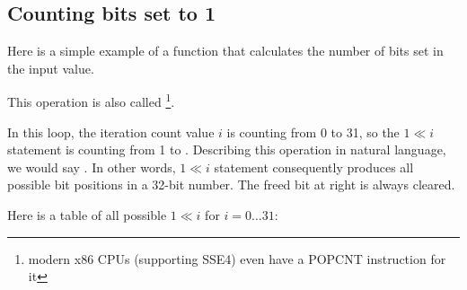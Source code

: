 ﻿\subsection{Counting bits set to 1}

Here is a simple example of a function that calculates the number of bits set in the input value.

This operation is also called \footnote{modern x86 CPUs (supporting SSE4) even have a POPCNT instruction for it}.



In this loop, the iteration count value $i$ is counting from 0 to 31, 
so the $1 \ll i$ statement is counting from 1 to .
Describing this operation in natural language, we would say .
In other words, $1 \ll i$ statement consequently produces all possible bit positions in a 32-bit number.
The freed bit at right is always cleared.

\label{2n_numbers_table}
Here is a table of all possible $1 \ll i$ 
for $i=0 \ldots 31$:

